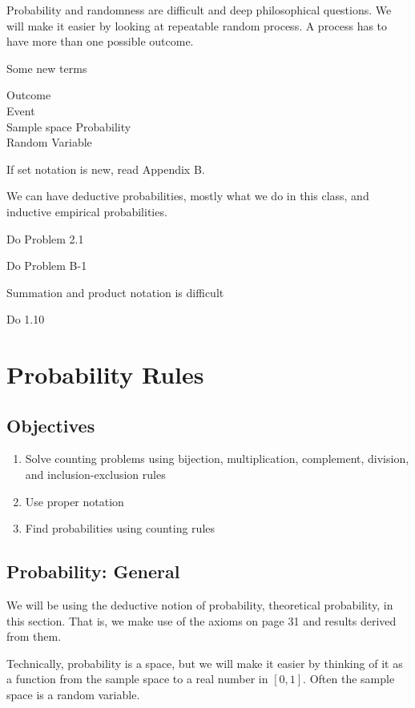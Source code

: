 \documentclass[]{book}
\providecommand{\tightlist}{%
  \setlength{\itemsep}{0pt}\setlength{\parskip}{0pt}}
\theoremstyle{definition}
\theoremstyle{definition}
\theoremstyle{definition}
\theoremstyle{remark}
\begin{document}
Probability and randomness are difficult and deep philosophical
questions. We will make it easier by looking at repeatable random
process. A process has to have more than one possible outcome.

Some new terms

Outcome\\
Event\\
Sample space Probability\\
Random Variable

If set notation is new, read Appendix B.

We can have deductive probabilities, mostly what we do in this class,
and inductive empirical probabilities.

Do Problem 2.1

Do Problem B-1

Summation and product notation is difficult

Do 1.10

\section{Probability Rules}\label{L5}

\subsection{Objectives}\label{objectives-4}

\begin{enumerate}
\def\labelenumi{\arabic{enumi}.}
\tightlist
\item
  Solve counting problems using bijection, multiplication, complement,
  division, and inclusion-exclusion rules\\
\item
  Use proper notation\\
\item
  Find probabilities using counting rules
\end{enumerate}

\subsection{Probability: General}\label{probability-general}

We will be using the deductive notion of probability, theoretical
probability, in this section. That is, we make use of the axioms on page
31 and results derived from them.

Technically, probability is a space, but we will make it easier by
thinking of it as a function from the sample space to a real number in
\([0,1]\). Often the sample space is a random variable.
\end{document}
